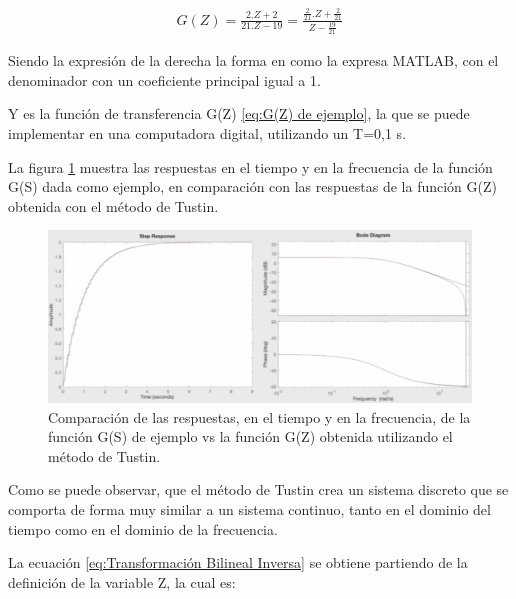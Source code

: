 \documentclass{article}
\begin{document}
\begin{sloppypar}
\begin{align}   \label{eq:G(Z) de ejemplo}
    G(Z)=\frac{2.Z+2}{21.Z-19}=\frac{\frac{2}{21}.Z+\frac{2}{21}}{Z-\frac{19}{21}}
\end{align}

Siendo la expresión de la derecha la forma en como la expresa MATLAB, con el denominador con un coeficiente principal igual a 1.

Y es la función de transferencia G(Z) \ref{eq:G(Z) de ejemplo}, la que se puede implementar en una computadora digital, utilizando un T=0,1 s.

La figura \ref{fig:Comparación de las respuestas, en el tiempo y en la frecuencia, de la función G(S) de ejemplo vs la función G(Z) obtenida utilizando el método de Tustin} muestra las respuestas en el tiempo y en la frecuencia de la función G(S) dada como ejemplo, en comparación con las respuestas de la función G(Z) obtenida con el método de Tustin.

\begin{figure}[H]
    \centering
    \includegraphics[width=1\textwidth]{Comparación de las respuestas, en el tiempo y en la frecuencia, de la función G(S) de ejemplo vs la función G(Z) obtenida utilizando el método de Tustin}
    \caption{Comparación de las respuestas, en el tiempo y en la frecuencia, de la función G(S) de ejemplo vs la función G(Z) obtenida utilizando el método de Tustin.}
    \label{fig:Comparación de las respuestas, en el tiempo y en la frecuencia, de la función G(S) de ejemplo vs la función G(Z) obtenida utilizando el método de Tustin}
\end{figure}

Como se puede observar, que el método de Tustin crea un sistema discreto que se comporta de forma muy similar a un sistema continuo, tanto en el dominio del tiempo como en el dominio de la frecuencia.

La ecuación \ref{eq:Transformación Bilineal Inversa} se obtiene partiendo de la definición de la variable Z, la cual es:


\end{sloppypar}
\end{document}
